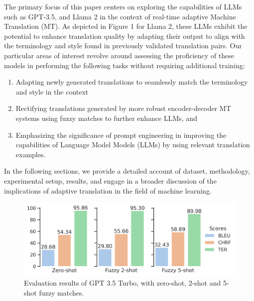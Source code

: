\documentclass[twocolumn]{article}
\begin{document}
The primary focus of this paper centers on exploring the capabilities of LLMs such as GPT-3.5, and Llama 2 in the context of real-time adaptive Machine Translation (MT). As depicted in Figure 1 for Llama 2, these LLMs exhibit the potential to enhance translation quality by adapting their output to align with the terminology and style found in previously validated translation pairs. Our particular areas of interest revolve around assessing the proficiency of these models in performing the following tasks without requiring additional training:


\begin{enumerate}
	\item Adapting newly generated translations to seamlessly match the terminology and style in the context
	
	\item Rectifying translations generated by more robust encoder-decoder MT systems using fuzzy matches to further enhance LLMs, and
	
	\item Emphasizing the significance of prompt engineering in improving the capabilities of Language Model Models (LLMs) by using relevant translation examples. 
	
\end{enumerate}

In the following sections, we provide a detailed account of dataset, methodology, experimental setup, results, and engage in a broader discussion of the implications of adaptive translation in the field of machine learning. 




\begin{figure}
	\centering
	\includegraphics[width=\linewidth, ]{figs/chagpt_3_5_evaluation} %
	\caption{ Evaluation results of GPT 3.5 Turbo, with zero-shot, 2-shot and 5-shot fuzzy matches.}
	
	\label{chagpt_3_5_evaluation:duck}
\end{figure}
\end{document}
